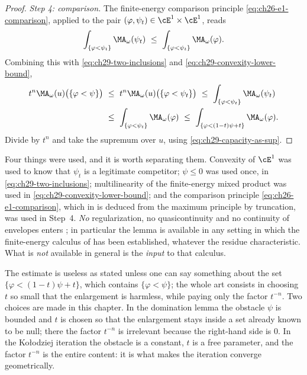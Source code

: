 \begin{proof}
\emph{Step 4: comparison.}  The finite-energy comparison principle
\eqref{eq:ch26-e1-comparison}, applied to the pair
$(\varphi,\psi_t)\in\cE^1\times\cE^1$, reads
\[
 \int_{\{\varphi<\psi_t\}}\MA_\omega(\psi_t)
 \ \leq\ \int_{\{\varphi<\psi_t\}}\MA_\omega(\varphi).
\]
Combining this with \eqref{eq:ch29-two-inclusions} and
\eqref{eq:ch29-convexity-lower-bound},
\[
\begin{aligned}
 t^n\MA_\omega(u)\bigl(\{\varphi<\psi\}\bigr)
 &\ \leq\ t^n\MA_\omega(u)\bigl(\{\varphi<\psi_t\}\bigr)
  \ \leq\ \int_{\{\varphi<\psi_t\}}\MA_\omega(\psi_t)\\
 &\ \leq\ \int_{\{\varphi<\psi_t\}}\MA_\omega(\varphi)
  \ \leq\ \int_{\{\varphi<(1-t)\psi+t\}}\MA_\omega(\varphi).
\end{aligned}
\]
Divide by $t^n$ and take the supremum over $u$, using
\eqref{eq:ch29-capacity-as-sup}.
\end{proof}

\begin{remark}
\label{rem:ch29-sublevel-hypotheses}
Four things were used, and it is worth separating them.  Convexity of
$\cE^1$ was used to know that $\psi_t$ is a legitimate competitor;
$\psi\leq0$ was used once, in \eqref{eq:ch29-two-inclusions};
multilinearity of the finite-energy mixed product was used in
\eqref{eq:ch29-convexity-lower-bound}; and the comparison principle
\eqref{eq:ch26-e1-comparison}, which in  is deduced
from the maximum principle  by
truncation, was used in Step~4.  \emph{No} regularization, no
quasicontinuity and no continuity of envelopes enters
; in particular the lemma is available in
any setting in which the finite-energy calculus of 
has been established, whatever the residue characteristic.  What is
\emph{not} available in general is the \emph{input} to that calculus.
\end{remark}

\begin{remark}
\label{rem:ch29-shape-of-rhs}
The estimate is useless as stated unless one can say something about the set
$\{\varphi<(1-t)\psi+t\}$, which contains
$\{\varphi<\psi\}$; the whole art consists in choosing $t$ so small that
the enlargement is harmless, while paying only the factor $t^{-n}$.  Two
choices are made in this chapter.  In the domination lemma
 the obstacle $\psi$ is bounded and
$t$ is chosen so that the enlargement stays inside a set already known to
be null; there the factor $t^{-n}$ is irrelevant because the right-hand
side is $0$.  In the Ko\l odziej iteration
 the obstacle is a constant, $t$ is a free
parameter, and the factor $t^{-n}$ is the entire content: it is what makes
the iteration converge geometrically.
\end{remark}

